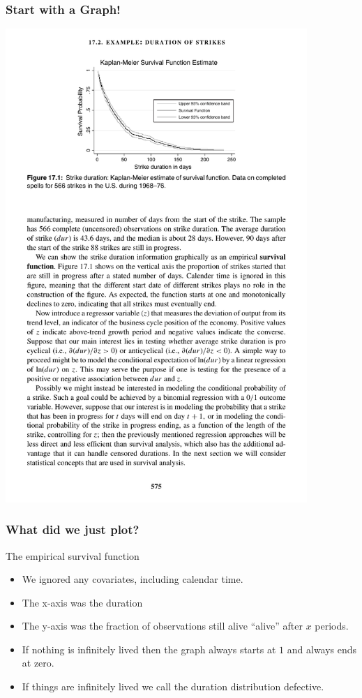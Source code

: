\documentclass[aspectratio=169]{beamer}
\begin{document}
\begin{frame}
\frametitle{Start with a Graph!}
\begin{center}
\includegraphics[width=4.5in]{./resources/figure17-1.pdf}
\end{center}
\end{frame}

\begin{frame}
\frametitle{What did we just plot?}
The \alert{empirical survival function}
\begin{itemize}
\item We ignored any covariates, including calendar time.
\item The x-axis was the duration
\item The y-axis was the fraction of observations still alive ``alive'' after $x$ periods.
\item If nothing is infinitely lived then the graph always starts at $1$ and always ends at zero.
\item If things are infinitely lived we call the duration distribution \alert{defective}.
\end{itemize}
\end{frame}
\end{document}
